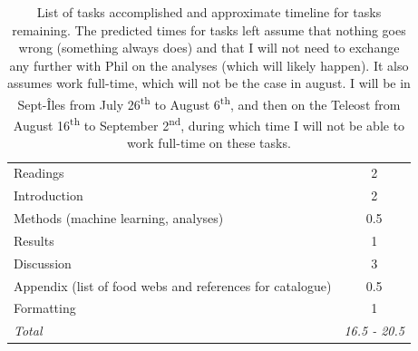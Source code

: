 \documentclass[letterpaper]{article}
\begin{document}
\begin{table}[h!]
\begin{tabular}{l c}
      Readings                                                    & 2           \\
      Introduction                                                & 2           \\
      Methods (machine learning, analyses)                        & 0.5         \\
      Results                                                     & 1           \\
      Discussion                                                  & 3           \\
      Appendix (list of food webs and references for catalogue)   & 0.5         \\
      Formatting                                                  & 1           \\
      \hline \hline
      \textit{Total}                                              &\textit{16.5 - 20.5} \\
      \hline
    \end{tabular}

    \caption{List of tasks accomplished and approximate timeline for tasks remaining. The predicted times for tasks left assume that nothing goes wrong (something always does) and that I will not need to exchange any further with Phil on the analyses (which will likely happen). It also assumes work full-time, which will not be the case in august. I will be in Sept-Îles from July 26\textsuperscript{th} to August 6\textsuperscript{th}, and then on the Teleost from August 16\textsuperscript{th} to September 2\textsuperscript{nd}, during which time I will not be able to work full-time on these tasks.}

  \end{table}

\newpage
\end{document}
